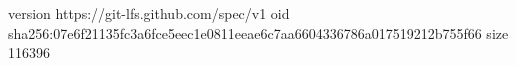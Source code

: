 version https://git-lfs.github.com/spec/v1
oid sha256:07e6f21135fc3a6fce5eec1e0811eeae6c7aa6604336786a017519212b755f66
size 116396

